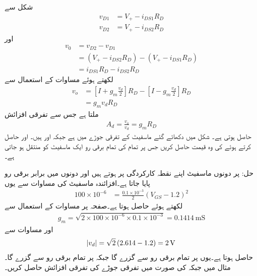 شکل  سے 
\begin{align*}
v_{D1}&=V_{+} - i_{DS1} R_D\\
v_{D2}&=V_{+}-i_{DS2} R_D
\end{align*}
اور
\begin{align*}
v_0&=v_{D2}-v_{D1}\\
&=(V_{+}-i_{DS2} R_D)-(V_{+} - i_{DS1} R_D)\\
&=i_{DS1}R_D-i_{DS2} R_D
\end{align*}
لکھتے ہوئے  مساوات  کے استعمال سے
\begin{align*}
v_o&=\left[I+g_m \frac{v_d}{2}\right]R_D-\left[I-g_m \frac{v_d}{2} \right] R_D\\
&=g_m v_d R_D
\end{align*}
ملتا ہے جس سے تفرقی افزائش
\begin{align}\label{مساوات_تفرقی_بنیادی_جوڑے_کی_افزائش}
A_d=\frac{v_o}{v_d}=g_m R_D
\end{align}
حاصل ہوتی ہے۔
شکل  میں دکھائے گئے ماسفیٹ کے تفرقی جوڑے میں  ہے جبکہ  اور  ہیں۔ اور  حاصل کرتے ہوئے  کی وہ قیمت حاصل کریں جس پر تمام کی تمام برقی رو ایک ماسفیٹ کو منتقل ہو جاتی ہے۔

حل: پر دونوں ماسفیٹ اپنے نقطہ کارکردگی پر ہوتے ہیں اور دونوں میں برابر  برقی رو پایا جاتا ہے۔افزائندہ ماسفیٹ کی مساوات سے یوں
\begin{align*}
100 \times 10^{-6}&=\frac{0.1 \times 10^{-3}}{2} \left(V_{GS}-1.2 \right)^2
\end{align*}
لکھتے ہوئے  حاصل ہوتا ہے۔صفحہ  پر مساوات  کے استعمال سے
\begin{align*}
g_m=\sqrt{2 \times 100 \times 10^{-6} \times 0.1 \times 10^{-3}}=\SI{0.1414}{\milli \siemens}
\end{align*}
اور مساوات  سے
\begin{align*}
\abs{v_d}=\sqrt{2} \left(2.614-1.2 \right)=\SI{2}{\volt}
\end{align*}
حاصل ہوتا ہے۔یوں  پر تمام برقی رو  سے  گزرے گا جبکہ  پر تمام برقی رو  سے گزرے گا۔
مثال  میں  جبکہ  کی صورت میں تفرقی جوڑے  کی تفرقی افزائش حاصل کریں۔

